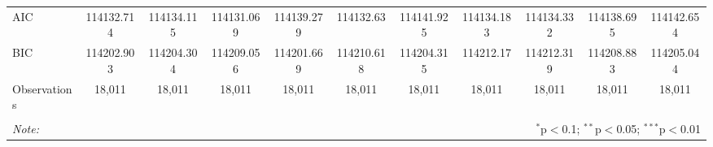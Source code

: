 \begin{table}[!htbp]
\begin{tabular}{@{\extracolsep{5pt}}lcccccccccc}
AIC & 114132.714 & 114134.115 & 114131.069 & 114139.279 & 114132.63 & 114141.925 & 114134.183 & 114134.332 & 114138.695 & 114142.654 \\ 
BIC & 114202.903 & 114204.304 & 114209.056 & 114201.669 & 114210.618 & 114204.315 & 114212.17 & 114212.319 & 114208.883 & 114205.044 \\ 
Observations & 18,011 & 18,011 & 18,011 & 18,011 & 18,011 & 18,011 & 18,011 & 18,011 & 18,011 & 18,011 \\ 
\hline 
\hline \\[-1.8ex] 
\textit{Note:}  & \multicolumn{10}{r}{$^{*}$p$<$0.1; $^{**}$p$<$0.05; $^{***}$p$<$0.01} \\ 
\end{tabular} 
\end{table} 
